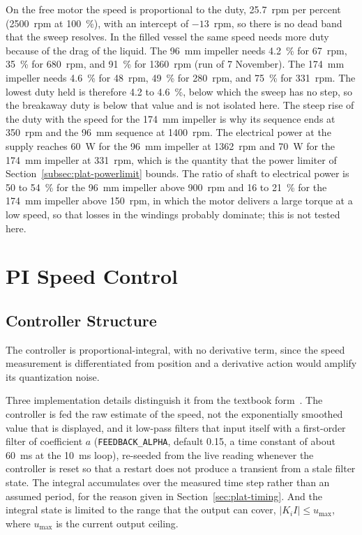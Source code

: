 On the free motor the speed is proportional to the duty, 25.7~rpm per percent (2500~rpm at 100~\%), with an intercept of $-13$~rpm, so there is no dead band that the sweep resolves. In the filled vessel the same speed needs more duty because of the drag of the liquid. The 96~mm impeller needs 4.2~\% for 67~rpm, 35~\% for 680~rpm, and 91~\% for 1360~rpm (run of 7 November). The 174~mm impeller needs 4.6~\% for 48~rpm, 49~\% for 280~rpm, and 75~\% for 331~rpm. The lowest duty held is therefore 4.2 to 4.6~\%, below which the sweep has no step, so the breakaway duty is below that value and is not isolated here. The steep rise of the duty with the speed for the 174~mm impeller is why its sequence ends at 350~rpm and the 96~mm sequence at 1400~rpm. The electrical power at the supply reaches 60~W for the 96~mm impeller at 1362~rpm and 70~W for the 174~mm impeller at 331~rpm, which is the quantity that the power limiter of Section~\ref{subsec:plat-powerlimit} bounds. The ratio of shaft to electrical power is 50 to 54~\% for the 96~mm impeller above 900~rpm and 16 to 21~\% for the 174~mm impeller above 150~rpm, in which the motor delivers a large torque at a low speed, so that losses in the windings probably dominate; this is not tested here. %


\section{PI Speed Control}
\label{sec:agit-pi}

\subsection{Controller Structure}
\label{subsec:agit-pi-structure}

The controller is proportional-integral, with no derivative term, since the speed measurement is differentiated from position and a derivative action would amplify its quantization noise.

Three implementation details distinguish it from the textbook form~\citep{astromhagglund2006,ogata2010}. The controller is fed the raw estimate of the speed, not the exponentially smoothed value that is displayed, and it low-pass filters that input itself with a first-order filter of coefficient $a$ (\texttt{FEEDBACK\_ALPHA}, default 0.15, a time constant of about 60~ms at the 10~ms loop), re-seeded from the live reading whenever the controller is reset so that a restart does not produce a transient from a stale filter state. The integral accumulates over the measured time step rather than an assumed period, for the reason given in Section~\ref{sec:plat-timing}. And the integral state is limited to the range that the output can cover, $|K_i I| \leq u_{\max}$, where $u_{\max}$ is the current output ceiling.

